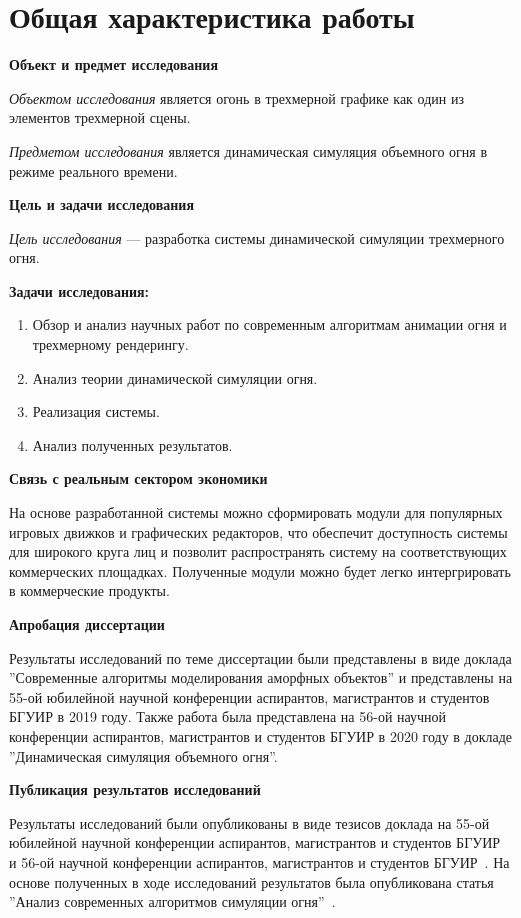 \part*{Общая характеристика работы}

\textbf{Объект и предмет исследования}

\emph{Объектом исследования} является огонь в трехмерной графике как один из
элементов трехмерной сцены.

\emph{Предметом исследования} является динамическая симуляция объемного огня в
режиме реального времени.

\textbf{Цель и задачи исследования}

\emph{Цель исследования} --- разработка системы динамической симуляции
\break{}трехмерного огня.

\textbf{Задачи исследования:}

\begin{enumerate}
	\item Обзор и анализ научных работ по современным алгоритмам анимации огня и
        трехмерному рендерингу.
	\item Анализ теории динамической симуляции огня.
	\item Реализация системы.
	\item Анализ полученных результатов.
\end{enumerate}

\textbf{Связь с реальным сектором экономики}

На основе разработанной системы можно сформировать модули для популярных игровых
движков и графических редакторов, что обеспечит доступность системы для широкого
круга лиц и позволит распространять систему на соответствующих коммерческих
площадках. Полученные модули можно будет легко интергрировать в коммерческие
продукты.

\textbf{Апробация диссертации}

Результаты исследований по теме диссертации были представлены в виде доклада
''Современные алгоритмы моделирования аморфных объектов'' и представлены на
55-ой юбилейной научной конференции аспирантов, магистрантов и студентов БГУИР
в 2019 году. Также работа была представлена на 56-ой научной конференции
аспирантов, магистрантов и студентов БГУИР в 2020 году в докладе ''Динамическая
симуляция объемного огня''.

\textbf{Публикация результатов исследований}

Результаты исследований были опубликованы в виде тезисов доклада на 55-ой
юбилейной научной конференции аспирантов, магистрантов и студентов
БГУИР~\cite{55_sntk} и 56-ой научной конференции аспирантов, магистрантов и
студентов БГУИР~\cite{56_sntk}.
На основе полученных в ходе исследований
результатов была опубликована статья ''Анализ современных алгоритмов симуляции
огня''~\cite{mol_uch}.
